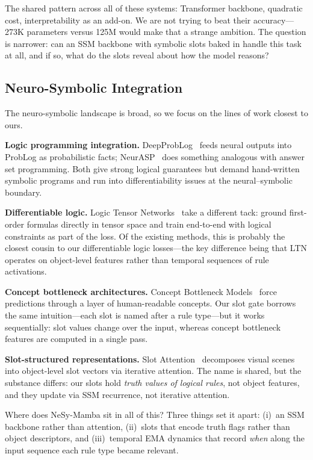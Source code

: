 \documentclass[conference]{IEEEtran}
\DeclareRobustCommand{\model}{NeSy-Mamba}
\begin{document}
The shared pattern across all of these systems: Transformer backbone,
quadratic cost, interpretability as an add-on.  We are not trying to
beat their accuracy---273K parameters versus 125M would make that a
strange ambition. The question is narrower: can an SSM backbone with
symbolic slots baked in handle this task at all, and if so, what do
the slots reveal about how the model reasons?

\subsection{Neuro-Symbolic Integration}

The neuro-symbolic landscape is broad, so we focus on the lines of
work closest to ours.

\textbf{Logic programming integration.}
DeepProbLog~\cite{manhaeve2018deepproblog} feeds neural outputs into
ProbLog as probabilistic facts; NeurASP~\cite{yang2020neurasp}
does something analogous with answer set programming. Both give
strong logical guarantees but demand hand-written symbolic programs
and run into differentiability issues at the neural--symbolic
boundary.

\textbf{Differentiable logic.}
Logic Tensor Networks~\cite{badreddine2022ltn} take a different
tack: ground first-order formulas directly in tensor space and
train end-to-end with logical constraints as part of the loss.
Of the existing methods, this is probably the closest cousin to
our differentiable logic losses---the key difference being that
LTN operates on object-level features rather than temporal
sequences of rule activations.

\textbf{Concept bottleneck architectures.}
Concept Bottleneck Models~\cite{koh2020cbm} force predictions
through a layer of human-readable concepts. Our slot gate borrows
the same intuition---each slot is named after a rule type---but it
works sequentially: slot values change over the input, whereas
concept bottleneck features are computed in a single pass.

\textbf{Slot-structured representations.}
Slot Attention~\cite{locatello2020slot} decomposes visual scenes
into object-level slot vectors via iterative attention. The name
is shared, but the substance differs: our slots hold
\emph{truth values of logical rules}, not object features, and
they update via SSM recurrence, not iterative attention.

Where does \model{} sit in all of this? Three things set it apart:
(i)~an SSM backbone rather than attention, (ii)~slots that encode
truth flags rather than object descriptors, and (iii)~temporal EMA
dynamics that record \emph{when} along the input sequence each rule
type became relevant.
\end{document}
